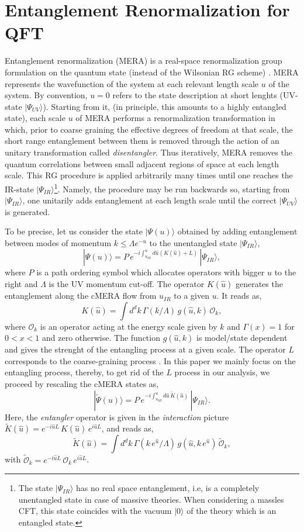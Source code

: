 \documentclass[preprint,aps]{revtex4}
\def\beq{\begin{equation}}
\def\eeq{\end{equation}}
\begin{document}
\section{Entanglement Renormalization for QFT}
\label{cMERA}
Entanglement renormalization (MERA) is a real-space renormalization group formulation on the quantum state (instead of the Wilsonian RG scheme) \cite{vidalmera, cMERA}. MERA represents the wavefunction of the system at each relevant length scale $u$ of the system. By convention, $u=0$ refers to the state description at short lenghts (UV-state $|\Psi_{UV}\rangle$). Starting from it, (in principle, this amounts to a highly entangled state), each scale $u$ of MERA performs a renormalization transformation in which, prior to coarse graining the effective degrees of freedom at that scale, the short range entanglement between them is removed through the  action of an unitary transformation called {\em disentangler}. Thus iteratively, MERA removes the quantum correlations between small adjacent regions of space at each length scale. This RG procedure is applied arbitrarily many times until one reaches the IR-state $|\Psi_{IR}\rangle$\footnote{The state $|\Psi_{IR}\rangle$ has no real space entanglement, i.e, is a completely unentangled state in case of massive theories. When considering a massles CFT, this state coincides with the vacuum $|0\rangle$ of the theory which is an entangled state.}. Namely, the procedure may be run backwards so, starting from $|\Psi_{IR}\rangle$, one unitarily adds entanglement at each length scale until the correct $|\Psi_{UV}\rangle$ is generated.

To be precise, let us consider the state $|\Psi(u)\rangle$ obtained by adding entanglement between modes of momentum $k \leq \Lambda e^{-u}$ to the unentangled state $|\Psi_{IR}\rangle$, 
\beq
\label{eq1.1}
|\Psi(u)\rangle = P\, e^{-i\int_{u_{IR}}^{u} d\hat{u}(K(\hat{u}) + L)}\, |\Psi_{IR}\rangle,
\eeq
where $P$ is a path ordering symbol which allocates operators with bigger $u$ to the right and $\Lambda$ is the UV momentum cut-off. The operator $K(\hat{u})$ generates the entanglement along the cMERA flow from $u_{IR}$ to a given $u$. It reads as,
\beq
\label{eq1.2}
K(\hat{u})=\int d^d k\, \Gamma(k/\Lambda)\, g(\hat{u},k)\, \mathcal{O}_k,
\eeq
where $\mathcal{O}_k$ is an operator acting at the energy scale given by $k$ and $\Gamma(x)=1$ for $0<x<1$ and zero otherwise. The function $g(\hat{u},k)$ is model/state dependent and gives the strenght of the entangling process at a given scale. The operator $L$ corresponds to the coarse-graining process \cite{cMERA,taka1}. In this paper we mainly focus on the entangling process, thereby, to get rid of the $L$ process in our analysis, we proceed by rescaling the cMERA states as,
\beq
\label{eq1.3}
|\widetilde{\Psi}(u)\rangle = P\, e^{-i\int_{u_{IR}}^{u} d\hat{u}\, \widetilde{K}(\hat{u})}\, |\Psi_{IR}\rangle.
\eeq
Here, the \textit{entangler} operator is given in the \textit{interaction} picture $ \widetilde{K}(\hat{u}) = e^{-i\hat{u}L}\, K(\hat{u})\, e^{i\hat{u}L}$, and reads as,
\beq
\label{eq1.4}
 \widetilde{K}(\hat{u}) = \int d^d k\, \Gamma(k\, e^{\hat{u}} /\Lambda)\, g(\hat{u},k\, e^{\hat{u}})\, \widetilde{\mathcal{O}}_k,
\eeq
with $ \widetilde{\mathcal{O}}_k = e^{-i\hat{u}L}\, \mathcal{O}_k\, e^{i\hat{u}L}$. 
\end{document}
